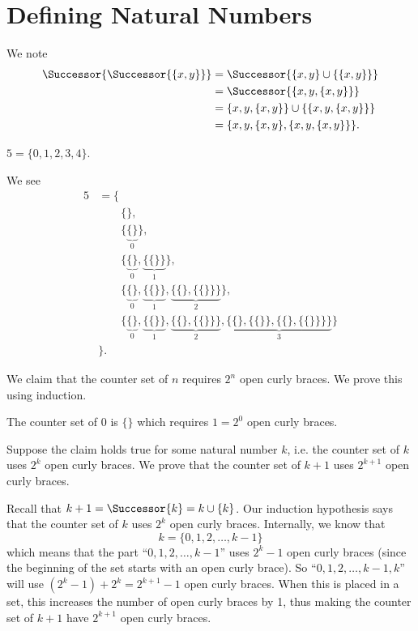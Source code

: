 \section{Defining Natural Numbers}
\begin{questions}
    \item We note
    \begin{align*}
        \Successor{\Successor{\{x, y\}}} &= \Successor{\{x, y\} \cup \{\{x, y\}\}}\\
        &= \Successor{\{x, y, \{x, y\}\}}\\
        &= \{x, y, \{x, y\}\} \cup \{\{x, y, \{x, y\}\}\}\\
        &= \{x, y, \{x, y\}, \{x, y, \{x, y\}\}\}.
    \end{align*}

    \item \begin{partquestions}{\roman*}
        \item $5 = \{0,1,2,3,4\}$.
        \item We see
        \begin{align*}
            5 &= \{\\
            &\quad\quad\{\},\\
            &\quad\quad\{\underbrace{\{\}}_0\},\\
            &\quad\quad\{\underbrace{\{\}}_0, \underbrace{\{\{\}\}}_1\},\\
            &\quad\quad\{\underbrace{\{\}}_0, \underbrace{\{\{\}\}}_1, \underbrace{\{\{\}, \{\{\}\}\}}_2\},\\
            &\quad\quad\{\underbrace{\{\}}_0, \underbrace{\{\{\}\}}_1, \underbrace{\{\{\}, \{\{\}\}\}}_2, \underbrace{\{\{\}, \{\{\}\}, \{\{\}, \{\{\}\}\}\}}_3\}\\
            &\}.
        \end{align*}
        \item We claim that the counter set of $n$ requires $2^n$ open curly braces. We prove this using induction.
        
        The counter set of 0 is $\{\}$ which requires $1 = 2^0$ open curly braces.

        Suppose the claim holds true for some natural number $k$, i.e. the counter set of $k$ uses $2^k$ open curly braces. We prove that the counter set of $k+1$ uses $2^{k+1}$ open curly braces.

        Recall that $k+1 = \Successor{k} = k \cup \{k\}$. Our induction hypothesis says that the counter set of $k$ uses $2^k$ open curly braces. Internally, we know that
        \[
            k = \{0, 1, 2, \dots, k-1\}
        \]
        which means that the part ``$0, 1, 2, \dots, k-1$'' uses $2^k - 1$ open curly braces (since the beginning of the set starts with an open curly brace). So ``$0, 1, 2, \dots, k-1, k$'' will use $(2^k - 1) + 2^k = 2^{k+1} - 1$ open curly braces. When this is placed in a set, this increases the number of open curly braces by 1, thus making the counter set of $k+1$ have $2^{k+1}$ open curly braces.


\end{partquestions}
\end{questions}

